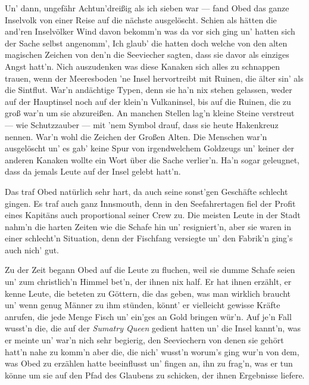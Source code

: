 Un' dann, ungefähr Achtun'dreißig als ich sieben war --- fand Obed das ganze Inselvolk von einer Reise auf die nächste ausgelöscht. Schien als hätten die and'ren Inselvölker Wind davon bekomm'n was da vor sich ging un' hatten sich der Sache selbst angenomm', Ich glaub' die hatten doch welche von den alten magischen Zeichen von den'n die Seeviecher sagten, dass sie davor als einziges Angst hatt'n. Nich auszudenken was diese Kanaken sich alles zu schnappen trauen, wenn der Meeresboden 'ne Insel hervortreibt mit Ruinen, die älter sin' als die Sintflut. War'n andächtige Typen, denn sie ha'n nix stehen gelassen, weder auf der Hauptinsel noch auf der klein'n Vulkaninsel, bis auf die Ruinen, die zu groß war'n um sie abzureißen. An manchen Stellen lag'n kleine Steine verstreut --- wie Schutzzauber --- mit 'nem Symbol drauf, dass sie heute Hakenkreuz nennen. War'n wohl die Zeichen der Großen Alten. Die Menschen war'n ausgelöscht un' es gab' keine Spur von irgendwelchem Goldzeugs un' keiner der anderen Kanaken wollte ein Wort über die Sache verlier'n. Ha'n sogar geleugnet, dass da jemals Leute auf der Insel gelebt hatt'n.

Das traf Obed natürlich sehr hart, da auch seine sonst'gen Geschäfte schlecht gingen. Es traf auch ganz Innsmouth, denn in den Seefahrertagen fiel der Profit eines Kapitäns auch proportional seiner Crew zu. Die meisten Leute in der Stadt nahm'n die harten Zeiten wie die Schafe hin un' resigniert'n, aber sie waren in einer schlecht'n Situation, denn der Fischfang versiegte un' den Fabrik'n ging's auch nich' gut.

Zu der Zeit begann Obed auf die Leute zu fluchen, weil sie dumme Schafe seien un' zum christlich'n Himmel bet'n, der ihnen nix half. Er hat ihnen erzählt, er kenne Leute, die beteten zu Göttern, die das geben, was man wirklich braucht un' wenn genug Männer zu ihm stünden, könnt' er vielleicht gewisse Kräfte anrufen, die jede Menge Fisch un' ein'ges an Gold bringen wür'n. Auf je'n Fall wusst'n die, die auf der \textit{Sumatry Queen} gedient hatten un' die Insel kannt'n, was er meinte un' war'n nich sehr begierig, den Seeviechern von denen sie gehört hatt'n nahe zu komm'n aber die, die nich' wusst'n worum's ging wur'n von dem, was Obed zu erzählen hatte beeinflusst un' fingen an, ihn zu frag'n, was er tun könne um sie auf den Pfad des Glaubens zu schicken, der ihnen Ergebnisse liefere.\grqq

